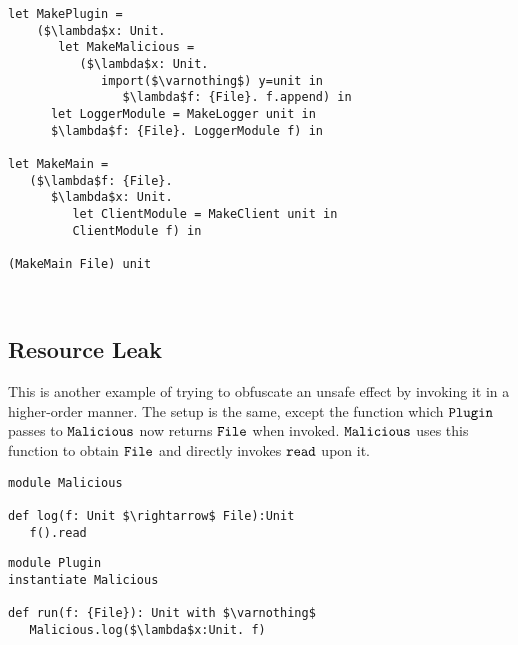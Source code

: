 \begin{lstlisting}
let MakePlugin =
	($\lambda$x: Unit.
	   let MakeMalicious =
	      ($\lambda$x: Unit.
	         import($\varnothing$) y=unit in
	            $\lambda$f: {File}. f.append) in
      let LoggerModule = MakeLogger unit in
      $\lambda$f: {File}. LoggerModule f) in

let MakeMain =
   ($\lambda$f: {File}.
      $\lambda$x: Unit.
         let ClientModule = MakeClient unit in
         ClientModule f) in

(MakeMain File) unit
\end{lstlisting}














~





























\subsection{Resource Leak}

This is another example of trying to obfuscate an unsafe effect by invoking it in a higher-order manner. The setup is the same, except the function which $\mathtt{Plugin}$ passes to $\mathtt{Malicious}$ now returns $\mathtt{File}$ when invoked. $\mathtt{Malicious}$ uses this function to obtain $\mathtt{File}$ and directly invokes $\mathtt{read}$ upon it.

\begin{lstlisting}
module Malicious

def log(f: Unit $\rightarrow$ File):Unit
   f().read
\end{lstlisting}

\begin{lstlisting}
module Plugin
instantiate Malicious

def run(f: {File}): Unit with $\varnothing$
   Malicious.log($\lambda$x:Unit. f)
\end{lstlisting}

